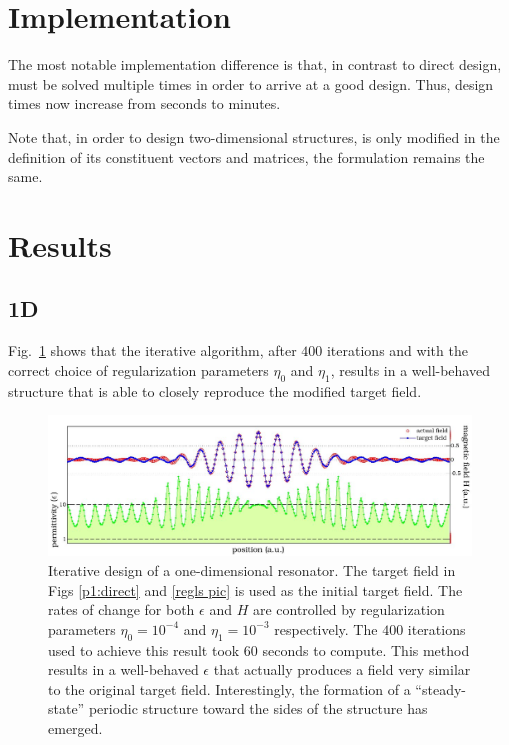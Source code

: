 \section{Implementation}
The most notable implementation difference is that,
    in contrast to direct design,
     must be solved multiple times
    in order to arrive at a good design.
Thus, design times now increase from seconds to minutes.

Note that, in order to design two-dimensional structures,
     is only modified in the
    definition of its constituent vectors and matrices,
    the formulation remains the same.


\section{Results}
\subsection{1D}
Fig.~\ref{comp pic} shows that the iterative algorithm, after $400$ iterations and with the correct choice of regularization parameters $\eta_0$ and $\eta_1$, results in a well-behaved structure that is able to closely reproduce the modified target field. 

\begin{figure}[htbp]\centering
\includegraphics[width=\textwidth]{p1/complementary}
\caption{Iterative design of a one-dimensional resonator. 
    The target field in Figs \ref{p1:direct} and \ref{regls pic} is used as the initial target field. The rates of change for both $\epsilon$ and $H$ are controlled by regularization parameters $\eta_0=10^{-4}$ and $\eta_1=10^{-3}$ respectively. The $400$ iterations used to achieve this result took $60$ seconds to compute. This method results in a well-behaved $\epsilon$ that actually produces a field very similar to the original target field. Interestingly, the formation of a ``steady-state'' periodic structure toward the sides of the structure has emerged.}
\label{comp pic}
\end{figure}

